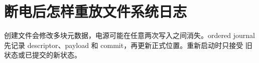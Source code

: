 \chapter{断电后怎样重放文件系统日志}

创建文件会修改多块元数据，电源可能在任意两次写入之间消失。ordered journal
先记录 descriptor、payload 和 commit，再更新正式位置。重新启动时只接受
旧状态或已提交的新状态。



